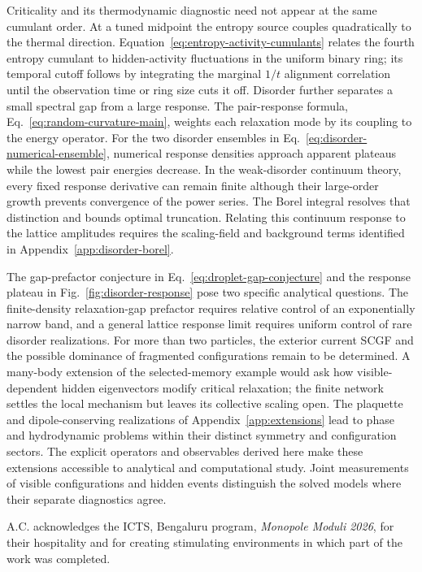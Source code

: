 \documentclass[aps,pre,reprint,amsmath,amssymb,longbibliography,floatfix]{revtex4-2}
\begin{document}
Criticality and its thermodynamic diagnostic need not appear at the same
cumulant order. At a tuned midpoint the entropy source couples
quadratically to the thermal direction. Equation~\eqref{eq:entropy-activity-cumulants} relates the fourth entropy
cumulant to hidden-activity fluctuations in the uniform binary ring;
its temporal cutoff follows by integrating the marginal $1/t$
alignment correlation until the observation time or ring size cuts it off.
Disorder further separates a small spectral gap from a large response.
The pair-response formula, Eq.~\eqref{eq:random-curvature-main}, weights
each relaxation mode by its coupling to the energy operator. For the two disorder ensembles in
Eq.~\eqref{eq:disorder-numerical-ensemble}, numerical response densities
approach apparent plateaus while the lowest pair energies decrease. In the weak-disorder
continuum theory, every fixed response derivative can remain finite
although their large-order growth prevents convergence of the power
series. The Borel integral resolves that distinction and bounds optimal
truncation. Relating this continuum response to the lattice amplitudes requires
the scaling-field and background terms identified in
Appendix~\ref{app:disorder-borel}.

The gap-prefactor conjecture in Eq.~\eqref{eq:droplet-gap-conjecture}
and the response plateau in Fig.~\ref{fig:disorder-response} pose two
specific analytical questions.
The finite-density relaxation-gap prefactor requires relative control of an
exponentially narrow band, and a general lattice response limit requires
uniform control of rare disorder realizations. For more than two
particles, the exterior current SCGF and the possible dominance of
fragmented configurations remain to be determined. A many-body extension of the selected-memory example would ask how
visible-dependent hidden eigenvectors modify critical relaxation;
the finite network settles the local mechanism but leaves its collective
scaling open. The plaquette and dipole-conserving realizations of
Appendix~\ref{app:extensions} lead to phase and hydrodynamic problems
within their distinct symmetry and configuration sectors. The explicit operators and observables derived here make these extensions
accessible to analytical and computational study. Joint measurements of
visible configurations and hidden events distinguish the solved models
where their separate diagnostics agree.

\begin{acknowledgments}
A.C. acknowledges the ICTS, Bengaluru program, \emph{Monopole Moduli 2026}, for their hospitality and for creating stimulating environments in which part of the work was completed.
\end{acknowledgments}
\end{document}
